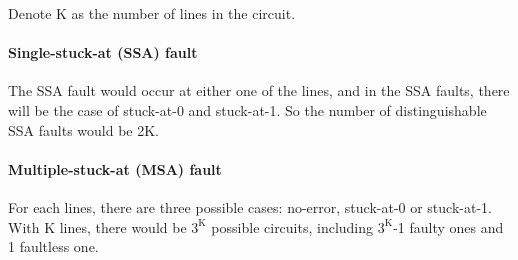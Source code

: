 Denote K as the number of lines in the circuit.

\paragraph{Single-stuck-at (SSA) fault}
The SSA fault would occur at either one of the lines, and in the SSA faults, there will be the case of stuck-at-0 and stuck-at-1. So the number of distinguishable SSA faults would be 2K.
\paragraph{Multiple-stuck-at (MSA) fault}
For each lines, there are three possible cases: no-error, stuck-at-0 or stuck-at-1. With K lines, there would be $\text{3}^\text{K}$ possible circuits, including $\text{3}^\text{K}$-1 faulty ones and 1 faultless one.
